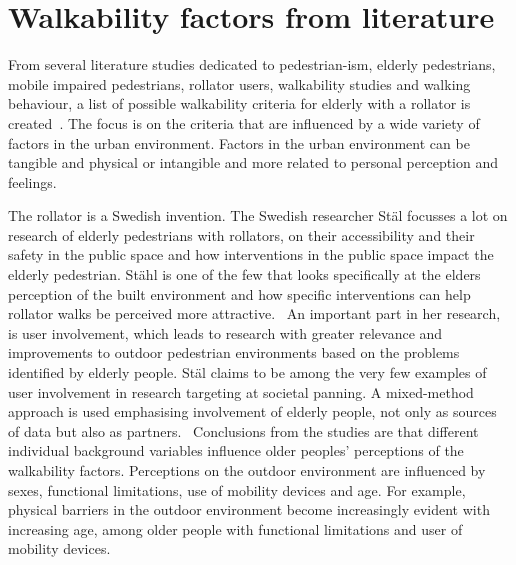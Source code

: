 \section{Walkability factors from literature}
From several literature studies dedicated to pedestrian-ism, elderly pedestrians, mobile impaired pedestrians, rollator users, walkability studies and walking behaviour, a list of possible walkability criteria for elderly with a rollator is created~\cite{ Bernhoft2008, Verschuur2013, Dunbar2004, Wennberg2010, Borst2008, Rosenberg2012, Vine2012, Matthews2003, Hovbrandt2007, WWT2012, Wennberg2009, Stahl2008, Stahl2013}. The focus is on the criteria that are influenced by a wide variety of factors in the urban environment. Factors in the urban environment can be tangible and physical or intangible and more related to personal perception and feelings.~\cite{Verschuur2013}

The rollator is a Swedish invention. The Swedish researcher St\"al focusses a lot on research of elderly pedestrians with rollators, on their accessibility and their safety in the public space and how interventions in the public space impact the elderly pedestrian. St\"ahl is one of the few that looks specifically at the elders perception of the built environment and how specific interventions can help rollator walks be perceived more attractive.~\cite{Stahl2008, Stahl2013} An important part in her research, is user involvement, which leads to research with greater relevance and improvements to outdoor pedestrian environments based on the problems identified by elderly people. St\"al claims to be among the very few examples of user involvement in research targeting at societal panning. A mixed-method approach is used emphasising involvement of elderly people, not only as sources of data but also as partners.~\cite{Stahl2008} Conclusions from the studies are that different individual background variables influence older peoples' perceptions of the walkability factors. Perceptions on the outdoor environment are influenced by sexes, functional limitations, use of mobility devices and age. For example, physical barriers in the outdoor environment become increasingly evident with increasing age, among older people with functional limitations and user of mobility devices.~\cite{Stahl2013, Wennberg2009}



